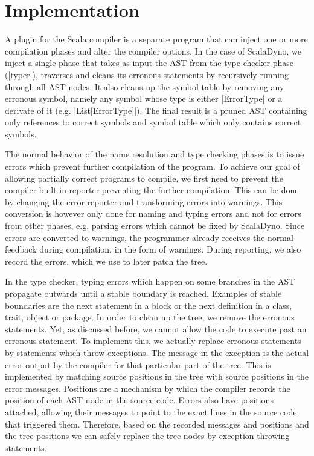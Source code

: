 \section{Implementation}

A plugin for the Scala compiler is a separate program that can inject one or more compilation phases and alter the compiler options. In the case of ScalaDyno, we inject a single phase that takes as input the AST from the type checker phase (|typer|), traverses and cleans its erronous statements by recursively running through all AST nodes. It also cleans up the symbol table by removing any erronous symbol, namely any symbol whose type is either |ErrorType| or a derivate of it (e.g. |List[ErrorType]|). The final result is a pruned AST containing only references to correct symbols and symbol table which only contains correct symbols.

The normal behavior of the name resolution and type checking phases is to issue errors which prevent further compilation of the program. To achieve our goal of allowing partially correct programs to compile, we first need to prevent the compiler built-in reporter preventing the further compilation. This can be done by changing the error reporter and transforming errors into warnings. This conversion is however only done for naming and typing errors and not for errors from other phases, e.g. parsing errors which cannot be fixed by ScalaDyno. Since errors are converted to warnings, the programmer already receives the normal feedback during compilation, in the form of warnings. During reporting, we also record the errors, which we use to later patch the tree.

In the type checker, typing errors which happen on some branches in the AST propagate outwards until a stable boundary is reached. Examples of stable boundaries are the next statement in a block or the next definition in a class, trait, object or package. In order to clean up the tree, we remove the erronous statements. Yet, as discussed before, we cannot allow the code to execute past an erronous statement. To implement this, we actually replace erronous statements by statements which throw exceptions. The message in the exception is the actual error output by the compiler for that particular part of the tree. This is implemented by matching source positions in the tree with source positions in the error messages. Positions are a mechanism by which the compiler records the position of each AST node in the source code. Errors also have positions attached, allowing their messages to point to the exact lines in the source code that triggered them. Therefore, based on the recorded messages and positions and the tree positions we can safely replace the tree nodes by exception-throwing statements.

